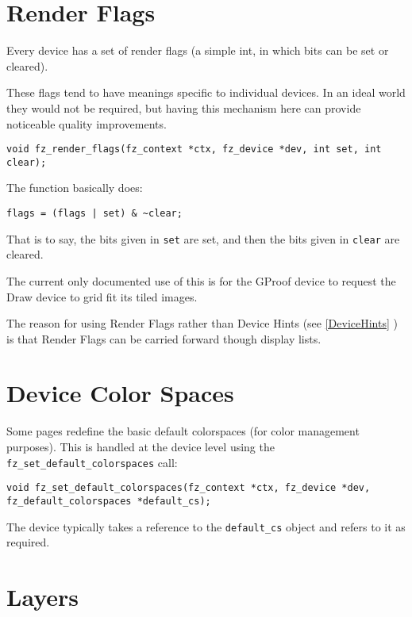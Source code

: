\documentclass[oneside]{book}
\newcommand{\rjwref}[1] {\autoref{#1} \nameref{#1}}
\begin{document}
\section{Render Flags}

Every device has a set of render flags (a simple int, in which bits can be set or cleared).

These flags tend to have meanings specific to individual devices. In an ideal world they would not be required, but having this mechanism here can provide noticeable quality improvements.

\begin{lstlisting}
void fz_render_flags(fz_context *ctx, fz_device *dev, int set, int clear);
\end{lstlisting}

The function basically does:

\begin{lstlisting}
flags = (flags | set) & ~clear;
\end{lstlisting}

That is to say, the bits given in \texttt{set} are set, and then the bits given in \texttt{clear} are cleared.

The current only documented use of this is for the GProof device to request the Draw device to grid fit its tiled images.

The reason for using Render Flags rather than Device Hints (see \rjwref{DeviceHints}) is that Render Flags can be carried forward though display lists.

\section{Device Color Spaces}

Some pages redefine the basic default colorspaces (for color management purposes). This is handled at the device level using the \texttt{fz\_set\_default\_colorspaces} call:

\begin{lstlisting}
void fz_set_default_colorspaces(fz_context *ctx, fz_device *dev, fz_default_colorspaces *default_cs);
\end{lstlisting}

The device typically takes a reference to the \texttt{default\_cs} object and refers to it as required.

\section{Layers}
\end{document}
